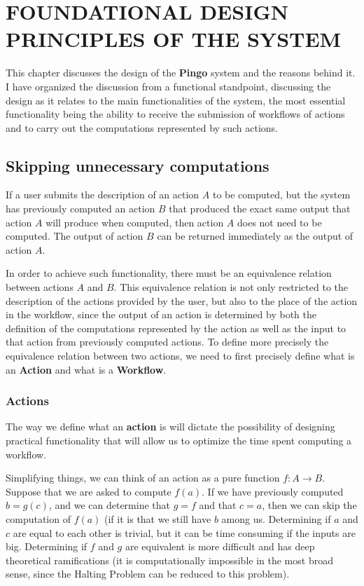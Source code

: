 \chapter{FOUNDATIONAL DESIGN PRINCIPLES OF THE SYSTEM}
\label{chap:foundational}
This chapter discusses the design of the \textbf{Pingo} system and the reasons behind it.  I have organized the discussion from a functional standpoint, discussing the design as it relates to the main functionalities of the system, the most essential functionality being the ability to receive the submission of workflows of actions and to carry out the computations represented by such actions.

\section{Skipping unnecessary computations}
If a user submits the description of an action $A$ to be computed, but the system has previously computed an action $B$ that produced the exact same output that action $A$ will produce when computed, then action $A$ does not need to be computed.  The output of action $B$ can be returned immediately as the output of action $A$.  

In order to achieve such functionality, there must be an equivalence relation between actions $A$ and $B$. This equivalence relation is not only restricted to the description of the actions provided by the user, but also to the place of the action in the workflow, since the output of an action is determined by both the definition of the computations represented by the action as well as the input to that action from previously computed actions. To define more precisely the equivalence relation between two actions, we need to first precisely define what is an \textbf{Action} and what is a \textbf{Workflow}.

\subsection{Actions}
The way we define what an \textbf{action} is will dictate the possibility of designing practical functionality that will allow us to optimize the time spent computing a workflow. 

Simplifying things, we can think of an action as a pure function $f:A \rightarrow B$.  Suppose that we are asked to compute $f(a)$.  If we have previously computed $b=g(c)$, and we can determine that $g=f$ and that $c=a$, then we can skip the computation of $f(a)$ (if it is that we still have $b$ among us.  Determining if $a$ and $c$ are equal to each other is trivial, but it can be time consuming if the inputs are big.  Determining if $f$ and $g$ are equivalent is more difficult and has deep theoretical ramifications (it is computationally impossible in the most broad sense, since the Halting Problem can be reduced to this problem).

